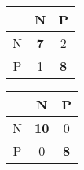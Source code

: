 \documentclass{article}
\begin{document}
\begin{table}
	\centering
	\begin{tabular}{c|cc}
		&N&P\\\hline
		N&\bf{7}&2\\
		P&1&\bf{8}\\
	\end{tabular}
\end{table}

\begin{table}
	\centering
	\begin{tabular}{c|cc}
		&N&P\\\hline
		N&\bf{10}&0\\
		P&0&\bf{8}\\
	\end{tabular}
\end{table}
\end{document}
